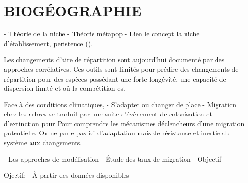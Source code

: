 \section*{\uppercase{BIOGÉOGRAPHIE}}

- Théorie de la niche
- Théorie métapop
- Lien le concept la niche d'établissement, peristence ().

Les changements d'aire de répartition sont aujourd'hui documenté par des approches corrélatives. Ces outils sont limités pour prédire des changements de répartition pour des espèces possédant une forte longévité, une capacité de dispersion limité et oû la compétition est

Face à des conditions climatiques, 
- S'adapter ou changer de place 
- Migration chez les arbres se traduit par une suite d'évènement de colonisation et d'extinction pour 
Pour comprendre les mécanismes déclencheurs d'une migration potentielle. On ne parle pas ici d'adaptation mais de résistance et inertie du système aux changements.



- Les approches de modélisation
- Étude des taux de migration
- Objectif 

Ojectif:
- À partir des données disponibles